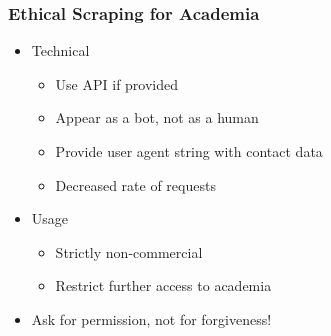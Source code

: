 \begin{frame}
    \frametitle{Ethical Scraping for Academia}
\begin{itemize}
    \item Technical
    \begin{itemize}
    \item Use API if provided
    \item Appear as a bot, not as a human
    \item Provide user agent string with contact data
    \item Decreased rate of requests
    \end{itemize}
    \end{itemize}
    \vspace{5pt}
    \begin{itemize}
    \item Usage
    \begin{itemize}
    \item Strictly non-commercial
    \item Restrict further access to academia
    \end{itemize}
\end{itemize}
    \vspace{5pt}
    \begin{itemize}
    \item Ask for permission, not for forgiveness!
    \end{itemize}
\end{frame}


